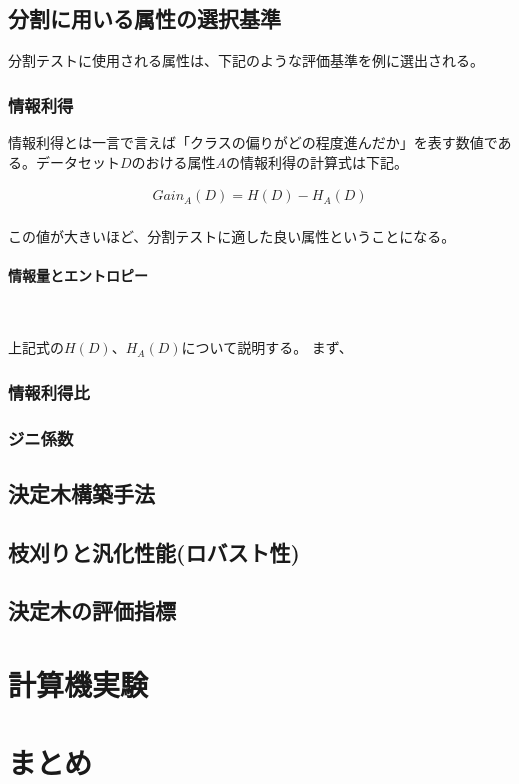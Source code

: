 \documentclass[dvipdfmx]{jsarticle}
\begin{document}
\subsection{分割に用いる属性の選択基準}
分割テストに使用される属性は、下記のような評価基準を例に選出される。
\subsubsection{情報利得}
情報利得とは一言で言えば「クラスの偏りがどの程度進んだか」を表す数値である。データセット$D$のおける属性$A$の情報利得の計算式は下記。
\begin{center}
  \begin{align*}
    Gain_{A}(D) = H(D) - H_{A}(D) \\
  \end{align*}
\end{center}
この値が大きいほど、分割テストに適した良い属性ということになる。
\paragraph{情報量とエントロピー}　\par
上記式の$H(D)$、$H_{A}(D)$について説明する。
まず、
\subsubsection{情報利得比}
\subsubsection{ジニ係数}



\subsection{決定木構築手法}
\subsection{枝刈りと汎化性能(ロバスト性)}
\subsection{決定木の評価指標}


\section{計算機実験}
\section{まとめ}
\end{document}
